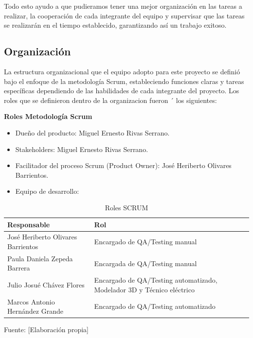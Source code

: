 {{Todo esto ayudo a que pudieramos tener una mejor organización en las tareas a realizar, la cooperación de cada integrante del equipo y supervisar que las tareas se realizarán en el tiempo establecido, garantizando así un trabajo exitoso.
 \subsection{Organización}
 La estructura organizacional que el equipo adopto para este proyecto se definió bajo el enfoque de la metodología Scrum, estableciendo funciones claras y tareas específicas dependiendo de las habilidades de cada integrante del proyecto. Los roles que se definieron dentro de la organizacion fueron ´
los siguientes:

\textbf{Roles Metodología Scrum }

\begin{itemize}
    \item Dueño del producto: Miguel Ernesto Rivas Serrano.
    \item Stakeholders: Miguel Ernesto Rivas Serrano.
    \item Facilitador del proceso Scrum (Product Owner): José Heriberto Olivares Barrientos.

\item {Equipo de desarrollo: }

\end{itemize}
\vspace{1em}

\begin{table}[H]
\centering
\caption{Roles SCRUM}
\label{tab:roles}

\renewcommand{\arraystretch}{1.3} 
\begin{tabular}{|p{5cm}|p{8cm}|} 
\hline
\textbf{Responsable} & \textbf{Rol} \\
\hline
José Heriberto Olivares Barrientos & Encargado de QA/Testing manual \\
\hline
Paula Daniela Zepeda Barrera & Encargada de QA/Testing manual \\
\hline
Julio Josué Chávez Flores & Encargado de QA/Testing automatizado, Modelador 3D y Técnico eléctrico \\
\hline
Marcos Antonio Hernández Grande & Encargado de QA/Testing automatizado \\
\hline
\end{tabular}

\vspace{0.5cm}
\centering
\small Fuente: [Elaboración propia]
\end{table}

}}
